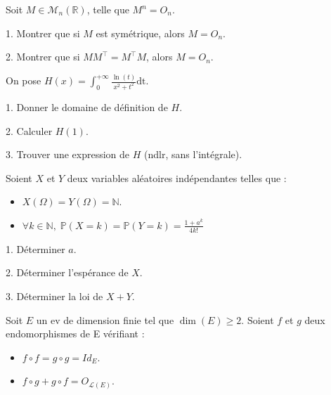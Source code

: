 \noindent Soit $M \in \mathcal{M}_n(\mathbb{R})$, telle que $M^n = O_n$.

\vspace{5pt}
1. Montrer que si $M$ est symétrique, alors $M = O_n$.

\vspace{5pt}
2. Montrer que si $MM^\top = M^\top M$, alors $M = O_n$.



\subetoiles



\noindent On pose $\displaystyle H(x) = \int_{0}^{+\infty} \frac {\ln(t)} {x^2 + t^2}\mathrm{dt}$.

\vspace{5pt}
1. Donner le domaine de définition de $H$.

\vspace{5pt}
2. Calculer $H(1)$.

\vspace{5pt}
3. Trouver une expression de $H$ (ndlr, sans l'intégrale).




\subetoiles



\noindent Soient $X$ et $Y$ deux variables aléatoires indépendantes telles que :
\begin{itemize}
  \item $X(\Omega) = Y(\Omega) = \mathbb{N}$.
  \item $\displaystyle \forall k \in \mathbb{N}, \; \mathbb{P}(X = k) = \mathbb{P}(Y = k) = \frac {1+a^k} {4k!}$
\end{itemize}


\vspace{5pt}
1. Déterminer $a$.

\vspace{5pt}
2. Déterminer l'espérance de $X$.

\vspace{5pt}
3. Déterminer la loi de $X + Y$.




\subetoiles
\columnbreak



\noindent Soit $E$ un ev de dimension finie tel que $\dim(E) \geqslant 2$.
\noindent Soient $f$ et $g$ deux \\ endomorphismes de E vérifiant :
\begin{itemize}
  \item $f \circ f = g \circ g = Id_E$.
  \item $f \circ g + g \circ f = O_{\mathcal{L}(E)}$.
\end{itemize}

